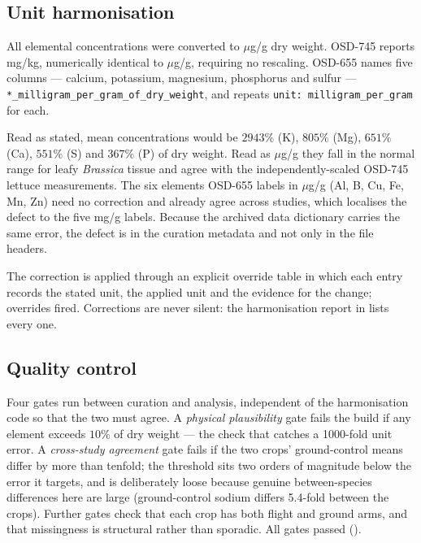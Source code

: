 \subsection{Unit harmonisation}
\label{sec:units}

All elemental concentrations were converted to $\mu$g/g dry weight. OSD-745
reports mg/kg, numerically identical to $\mu$g/g, requiring no rescaling.
OSD-655 names five columns --- calcium, potassium, magnesium, phosphorus and
sulfur --- \texttt{*\_milligram\_per\_gram\_of\_dry\_weight}, and
 repeats
\texttt{unit: milligram\_per\_gram} for each.

\begin{smacaution}[title=The values are not mg/g]
Read as stated, mean concentrations would be $2943\%$ (K), $805\%$ (Mg),
$651\%$ (Ca), $551\%$ (S) and $367\%$ (P) of dry weight. Read as $\mu$g/g they
fall in the normal range for leafy \emph{Brassica} tissue and agree with the
independently-scaled OSD-745 lettuce measurements. The six elements OSD-655
labels in $\mu$g/g (Al, B, Cu, Fe, Mn, Zn) need no correction and already agree
across studies, which localises the defect to the five mg/g labels. Because the
archived data dictionary carries the same error, the defect is in the curation
metadata and not only in the file headers.
\end{smacaution}

The correction is applied through an explicit override table in which each entry
records the stated unit, the applied unit and the evidence for the change;
\NUnitOverrides{} overrides fired. Corrections are never silent: the
harmonisation report in  lists every one.

\subsection{Quality control}

Four gates run between curation and analysis, independent of the harmonisation
code so that the two must agree. A \emph{physical plausibility} gate fails the
build if any element exceeds $10\%$ of dry weight --- the check that catches a
1000-fold unit error. A \emph{cross-study agreement} gate fails if the two
crops' ground-control means differ by more than tenfold; the threshold sits two
orders of magnitude below the error it targets, and is deliberately loose
because genuine between-species differences here are large (ground-control
sodium differs 5.4-fold between the crops). Further gates check that each crop
has both flight and ground arms, and that missingness is structural rather than
sporadic. All gates passed (\QCAllPassed).

